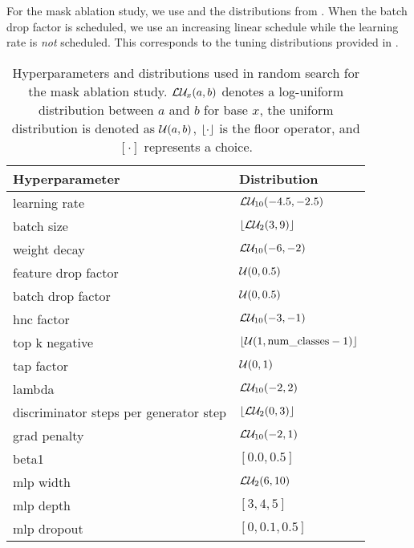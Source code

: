 For the mask ablation study, we use \adam \citep{Kingma2015} and the distributions from . When the batch drop factor is scheduled, we use an increasing linear schedule while the learning rate is \emph{not} scheduled. This corresponds to the tuning distributions provided in \domainbed.
\begin{table}[!htbp]
\small
    \centering
    \begin{tabular}{ll}
        \toprule
        \textbf{Hyperparameter} & \textbf{Distribution} \\
        \midrule
        learning rate & $\loguni{-4.5}{-2.5}$ \\
        batch size  & $\floor*{\logunitwo{3}{9}}$ \\
        weight decay  & $\loguni{-6}{-2}$ \\
        feature drop factor  & $\uni{0}{0.5}$ \\
        batch drop factor  & $\uni{0}{0.5}$ \\
        hnc factor & $\loguni{-3}{-1}$ \\
        top k negative & $\floor*{\uni{1}{\mathrm{num\_classes} - 1}}$ \\
        tap factor & $\uni{0}{1}$ \\
        lambda & $\loguni{-2}{2}$ \\
        discriminator steps per generator step & $\floor*{\logunitwo{0}{3}}$ \\
        grad penalty & $\loguni{-2}{1}$ \\
        beta1 & $[0.0, 0.5]$ \\
        mlp width & $\logunitwo{6}{10}$ \\
        mlp depth & $[3, 4, 5]$ \\
        mlp dropout & $[0, 0.1, 0.5]$ \\
        \bottomrule 
    \end{tabular}
    \caption[Hyperparameters and distributions used for the mask ablation study]{Hyperparameters and distributions used in random search for the mask ablation study. $\logunix{a}{b}$ denotes a log-uniform distribution between $a$ and $b$ for base $x$, the uniform distribution is denoted as $\uni{a}{b}$, $\floor*{\cdot}$ is the floor operator, and $[\cdot]$ represents a choice.}
    \label{tab:abl-distributions-mask}
\end{table}